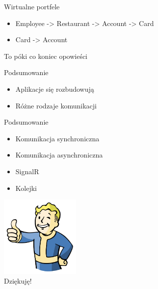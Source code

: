 \documentclass{beamer}
\begin{document}
\begin{frame}{Wirtualne portfele}
	\begin{huge}
		\begin{itemize}[<+->]
			\item Employee -> Restaurant -> Account -> Card
			\item Card -> Account
		\end{itemize}
	\end{huge}
\end{frame}


\begin{frame}{}
	\begin{center}
		\Huge{To póki co koniec opowieści}
	\end{center}
\end{frame}

\begin{frame}{Podsumowanie}
	\begin{huge}
		\begin{itemize}[<+->]
			\item Aplikacje się rozbudowują
			\item Różne rodzaje komunikacji
		\end{itemize}
	\end{huge}
\end{frame}

\begin{frame}{Podsumowanie}
	\begin{huge}
		\begin{itemize}[<+->]
			\item Komunikacja synchroniczna
			\item Komunikacja asynchroniczna
			\item SignalR
			\item Kolejki
		\end{itemize}
	\end{huge}
\end{frame}

\begin{frame}{}
	\begin{center}
  		\includegraphics[height=4cm]{ok.png} \\
		\Huge{Dziękuję!}
	\end{center}
\end{frame}
\end{document}

